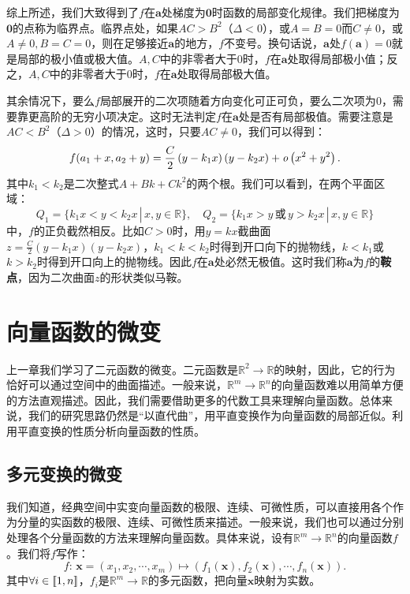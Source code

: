 \documentclass[12pt,UTF8]{ctexbook}
\begin{document}
综上所述，我们大致得到了$f$在$\mathbf{a}$处梯度为$\mathbf{0}$时函数的局部变化规律。我们把梯度为$\mathbf{0}$的点称为临界点。临界点处，如果$AC > B^2$（$\Delta < 0$），或$A=B=0$而$C\neq 0$，或$A\neq 0,B=C=0$，则在足够接近$\mathbf{a}$的地方，$f$不变号。换句话说，$\mathbf{a}$处$f(\mathbf{a}) = 0$就是局部的极小值或极大值。$A,C$中的非零者大于$0$时，$f$在$\mathbf{a}$处取得局部极小值；反之，$A,C$中的非零者大于$0$时，$f$在$\mathbf{a}$处取得局部极大值。

其余情况下，要么$f$局部展开的二次项随着方向变化可正可负，要么二次项为$0$，需要靠更高阶的无穷小项决定。这时无法判定$f$在$\mathbf{a}$处是否有局部极值。需要注意是$AC<B^2$（$\Delta > 0$）的情况，这时，只要$AC\neq 0$，我们可以得到：
$$ f(a_1+x,a_2+y) = \frac{C}{2}\left(y - k_1x\right)(y - k_2x) + \mathit{o}\left(x^2+y^2\right). $$
其中$k_1<k_2$是二次整式$A + Bk + Ck^2$的两个根。我们可以看到，在两个平面区域：
$$ Q_1 = \{k_1x<y<k_2x\,|\,x,y\in\mathbb{R}\}, \quad Q_2 = \{k_1x>y\,\text{或}\,y>k_2x\,|\,x,y\in\mathbb{R}\} $$
中，$f$的正负截然相反。比如$C>0$时，用$y=kx$截曲面$z = \frac{C}{2}\left(y - k_1x\right)(y - k_2x)$，$k_1<k<k_2$时得到开口向下的抛物线，$k<k_1$或$k>k_2$时得到开口向上的抛物线。因此$f$在$\mathbf{a}$处必然无极值。这时我们称$\mathbf{a}$为$f$的\textbf{鞍点}，因为二次曲面$z$的形状类似马鞍。

\chapter{向量函数的微变}
上一章我们学习了二元函数的微变。二元函数是$\mathbb{R}^2\rightarrow\mathbb{R}$的映射，因此，它的行为恰好可以通过空间中的曲面描述。一般来说，$\mathbb{R}^m\rightarrow\mathbb{R}^n$的向量函数难以用简单方便的方法直观描述。因此，我们需要借助更多的代数工具来理解向量函数。总体来说，我们的研究思路仍然是“以直代曲”，用平直变换作为向量函数的局部近似。利用平直变换的性质分析向量函数的性质。

\section{多元变换的微变}
我们知道，经典空间中实变向量函数的极限、连续、可微性质，可以直接用各个作为分量的实函数的极限、连续、可微性质来描述。一般来说，我们也可以通过分别处理各个分量函数的方法来理解向量函数。具体来说，设有$\mathbb{R}^m\rightarrow\mathbb{R}^n$的向量函数$f$。我们将$f$写作：
$$ f:\,\mathbf{x} = (x_1,x_2,\cdots,x_m)\mapsto (f_1(\mathbf{x}), f_2(\mathbf{x}), \cdots, f_n(\mathbf{x})).$$
其中$\forall i\in[\![1,n]\!]$，$f_i$是$\mathbb{R}^m\rightarrow\mathbb{R}$的多元函数，把向量$\mathbf{x}$映射为实数。
\end{document}
